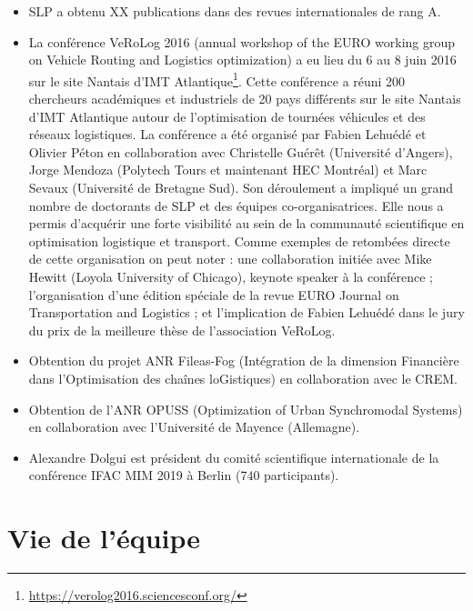 \begin{itemize}
    \item SLP a obtenu XX publications  dans des revues internationales de rang A.
    \item La conférence VeRoLog 2016 (annual workshop of the EURO working group on Vehicle Routing and Logistics optimization) a eu lieu du 6 au 8 juin 2016 sur le site Nantais d'IMT Atlantique\footnote{\url{https://verolog2016.sciencesconf.org/}}. 
    Cette conférence a réuni 200 chercheurs académiques et industriels de 20 pays différents sur le site Nantais d'IMT Atlantique autour de l'optimisation de tournées véhicules et des réseaux logistiques. 
    La conférence a été organisé par Fabien Lehuédé et Olivier Péton en collaboration avec Christelle Guérêt (Université d'Angers), Jorge Mendoza (Polytech Tours et maintenant HEC Montréal) et Marc Sevaux (Université de Bretagne Sud). 
    Son déroulement a impliqué un grand nombre de doctorants de SLP et des équipes co-organisatrices. Elle nous a permis d'acquérir une forte visibilité au sein de la communauté scientifique en optimisation logistique et transport. 
    Comme exemples de retombées directe de cette organisation on peut noter : 
    une collaboration initiée avec Mike Hewitt (Loyola University of Chicago), keynote speaker à la conférence ; 
    l'organisation d'une édition spéciale de la revue  EURO Journal on Transportation and Logistics \cite{gueret:hal-01813905} ; 
    et l'implication de Fabien Lehuédé dans le jury du prix de la meilleure thèse de l'association VeRoLog. 
    \item Obtention du projet ANR Fileas-Fog (Intégration de la dimension Financière dans l’Optimisation des chaînes loGistiques) en collaboration avec le CREM.
    \item Obtention de l'ANR OPUSS (Optimization of Urban Synchromodal Systems) en collaboration avec l'Université de Mayence (Allemagne).
    \item Alexandre Dolgui est président du comité scientifique internationale de la conférence IFAC MIM 2019 à Berlin (740 participants). 
\end{itemize}


\section{Vie de l'équipe}\label{slp:vieequipe}

